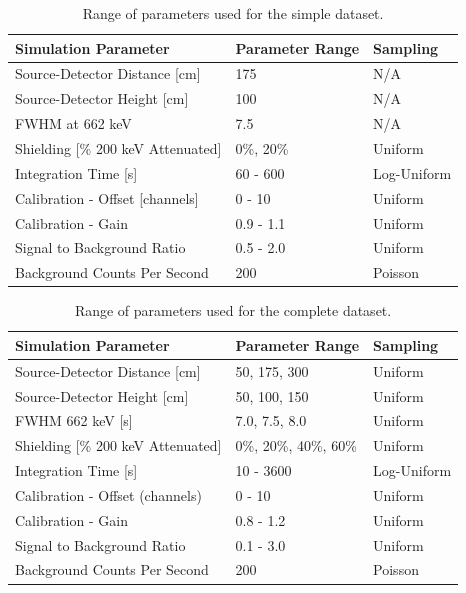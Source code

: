 \begin{table}[H]
	\centering
	\caption{Range of parameters used for the simple dataset.}
	\label{table:hyperparameter_dataset_easy_parameters}
	\begin{tabular}{lll}
		\hline
		\textbf{Simulation Parameter} & \textbf{Parameter Range} & \textbf{Sampling} \\ \hline
		Source-Detector Distance [cm] & 175 & N/A \\ 
		Source-Detector Height [cm] & 100 & N/A \\ 
		FWHM at 662 keV & 7.5 & N/A \\ 
		Shielding [\% 200 keV Attenuated] & 0\%, 20\% & Uniform \\ 
		Integration Time [s] & 60 - 600 & Log-Uniform \\ 
		Calibration - Offset [channels] & 0 - 10 & Uniform \\ 
		Calibration - Gain & 0.9 - 1.1 & Uniform \\ 
		Signal to Background Ratio & 0.5 - 2.0 & Uniform \\ 
		Background Counts Per Second & 200 & Poisson \\ \hline
	\end{tabular}
\end{table}


\begin{table}[H]
	\centering
	\caption{Range of parameters used for the complete dataset.}
	\label{table:hyperparameter_dataset_full_parameters}
	\begin{tabular}{lll}
		\hline
		\textbf{Simulation Parameter} & \textbf{Parameter Range} & \textbf{Sampling} \\ \hline
		Source-Detector Distance {[}cm{]} & 50, 175, 300 & Uniform \\ 
		Source-Detector Height {[}cm{]} & 50, 100, 150 & Uniform \\ 
		FWHM 662 keV {[}s{]} & 7.0, 7.5, 8.0 & Uniform \\ 
		Shielding [\% 200 keV Attenuated] & 0\%, 20\%, 40\%, 60\% & Uniform \\ 
		Integration Time {[}s{]} & 10 - 3600 & Log-Uniform \\ 
		Calibration - Offset (channels) & 0 - 10 & Uniform \\ 
		Calibration - Gain & 0.8 - 1.2 & Uniform \\ 
		Signal to Background Ratio & 0.1 - 3.0 & Uniform \\ 
		Background Counts Per Second & 200 & Poisson \\ \hline
	\end{tabular}
\end{table}


